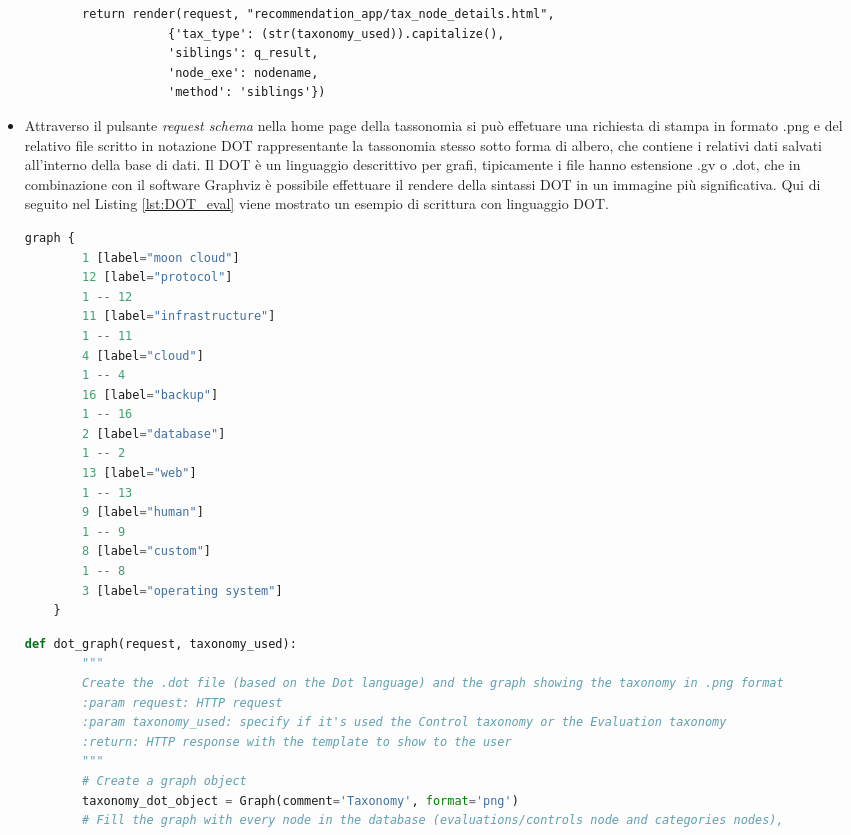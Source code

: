 \begin{itemize}
\begin{lstlisting}
        return render(request, "recommendation_app/tax_node_details.html",
                    {'tax_type': (str(taxonomy_used)).capitalize(),
                    'siblings': q_result,
                    'node_exe': nodename,
                    'method': 'siblings'})
    \end{lstlisting}
    \item Attraverso il pulsante \textit{request schema} nella home page della tassonomia si può effetuare una richiesta di stampa in formato .png e del 
    relativo file scritto in notazione DOT rappresentante la tassonomia stesso sotto forma di albero, che contiene i relativi dati salvati all'interno 
    della base di dati.\hfill\break
    Il DOT è un linguaggio descrittivo per grafi, tipicamente i file hanno estensione .gv o .dot, che in combinazione con il software Graphviz è possibile 
    effettuare il rendere della sintassi DOT in un immagine più significativa. Qui di seguito nel Listing \ref{lst:DOT_eval} viene mostrato un esempio di 
    scrittura con linguaggio DOT.
    \lstset{style=python_code_style}
    \begin{lstlisting}[language=Python, label=lst:DOT_eval, caption={Codice parziale utilizzato per realizzare lo schema della tassonomia
        per le Evaluation.}]
    graph {
        1 [label="moon cloud"]
        12 [label="protocol"]
        1 -- 12
        11 [label="infrastructure"]
        1 -- 11
        4 [label="cloud"]
        1 -- 4
        16 [label="backup"]
        1 -- 16
        2 [label="database"]
        1 -- 2
        13 [label="web"]
        1 -- 13
        9 [label="human"]
        1 -- 9
        8 [label="custom"]
        1 -- 8
        3 [label="operating system"]
    }
    \end{lstlisting}
    \lstset{style=python_code_style}
    \begin{lstlisting}[language=Python, label=lst:view_DOT_eval, caption={Codice utilizzato per la realizzazione del
        file .dot e relativa immagine .png.}]
    def dot_graph(request, taxonomy_used):
        """
        Create the .dot file (based on the Dot language) and the graph showing the taxonomy in .png format
        :param request: HTTP request
        :param taxonomy_used: specify if it's used the Control taxonomy or the Evaluation taxonomy
        :return: HTTP response with the template to show to the user
        """
        # Create a graph object
        taxonomy_dot_object = Graph(comment='Taxonomy', format='png')
        # Fill the graph with every node in the database (evaluations/controls node and categories nodes), 

\end{lstlisting}
\end{itemize}
